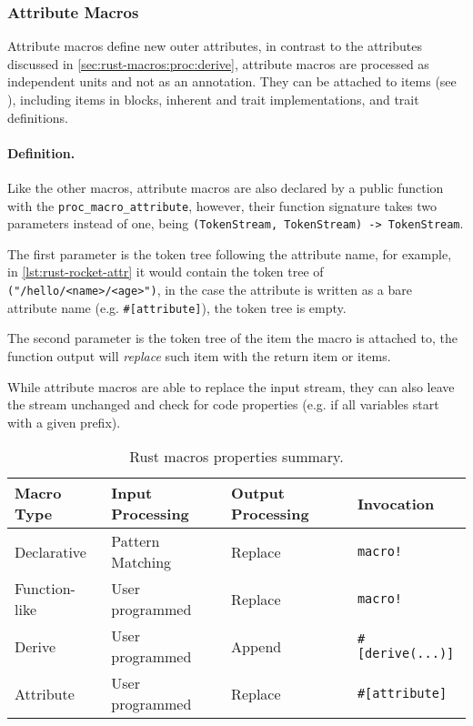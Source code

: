 

\subsubsection*{Attribute Macros}\label{sec:rust-macros:proc:attr}
Attribute macros define new outer attributes,
in contrast to the attributes discussed in \autoref{sec:rust-macros:proc:derive},
attribute macros are processed as independent units and not as an annotation.
They can be attached to items (see \autocite[Section 6]{RustRef2021}),
including items in  blocks, inherent and trait implementations, and trait definitions.

\paragraph{Definition.}
Like the other macros, attribute macros are also declared by a public function with the \texttt{proc\_macro\_attribute},
however, their function signature takes two parameters instead of one, being \texttt{(TokenStream, TokenStream) -> TokenStream}.

The first parameter is the token tree following the attribute name, for example, in \autoref{lst:rust-rocket-attr}
it would contain the token tree of \texttt{("/hello/<name>/<age>")},
in the case the attribute is written as a bare attribute name (e.g. \texttt{\#[attribute]}),
the token tree is empty.

The second parameter is the token tree of the item the macro is attached to,
the function output will \emph{replace} such item with the return item or items.

While attribute macros are able to replace the input stream,
they can also leave the stream unchanged and check for code properties (e.g. if all variables start with a given prefix).



\begin{table}
	\centering
	\begin{tabular}{l|l|l|l}
		Macro Type    & Input Processing & Output Processing & Invocation                 \\
		\hline
		Declarative   & Pattern Matching & Replace           & \texttt{macro!}            \\
		Function-like & User programmed  & Replace           & \texttt{macro!}            \\
		Derive        & User programmed  & Append            & \texttt{\#{[}derive(...)]} \\
		Attribute     & User programmed  & Replace           & \texttt{\#{[}attribute]}
	\end{tabular}
	\caption{Rust macros properties summary.}
	\label{tab:rust-macros}
\end{table}


